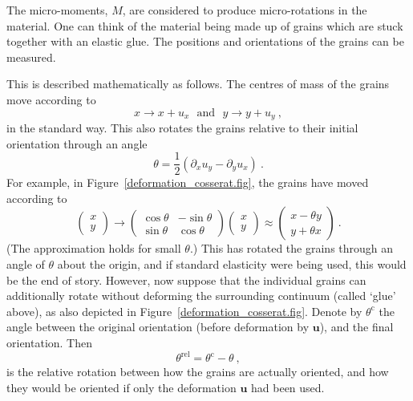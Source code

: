 \documentclass[]{scrreprt}
\newcommand{\mand}{\ \ \ \mbox{and}\ \ \ }
\newcommand{\pl}{\partial}
\newcommand{\ha}{\mbox{$\frac{1}{2}$}}
\newcommand{\thetac}{\theta^{\mathrm{c}}}
\newcommand{\thetarel}{\theta^{\mathrm{rel}}}
\begin{document}
The micro-moments, $M$, are considered to produce micro-rotations in
the material.  One can think of the material being made up of grains
which are stuck together with an elastic glue.  The positions and
orientations of the grains can be measured.

This is described mathematically as follows.  The centres of mass of
the grains move according to
$$
x \rightarrow x + u_{x} \mand y\rightarrow y+ u_{y} \ ,
$$
in the standard way.  This also rotates the grains relative to their
initial orientation through an angle
$$
\theta = \ha(\pl_{x}u_{y}-\pl_{y}u_{x}) \ .
$$
For example, in Figure~\ref{deformation_cosserat.fig}, the grains have
moved according to
\begin{equation}
\left(\begin{array}{c}x\\y\end{array}\right) \rightarrow
\left(\begin{array}{cc}\cos\theta & -\sin\theta \\ \sin\theta & \cos\theta
\end{array}\right)
\left(\begin{array}{c}x\\y\end{array}\right)
\approx
\left(\begin{array}{c}x - \theta y\\y + \theta x\end{array}\right)   \ .
\label{rigid.rot.eqn}
\end{equation}
(The approximation holds for small $\theta$.)  This has rotated the
grains through an angle of $\theta$ about the origin, and if standard
elasticity were being used, this would be the end of story.  However,
now suppose that the individual grains can additionally rotate without
deforming the surrounding continuum (called `glue' above), as also
depicted in Figure~\ref{deformation_cosserat.fig}.  Denote by
$\thetac$ the angle between the original orientation (before
deformation by ${\mathbf u}$), and the final orientation.  Then
$$
\thetarel = \thetac - \theta \ ,
$$
is the relative rotation between how the grains are actually oriented,
and how they would be oriented if only the deformation ${\mathbf u}$
had been used.
\end{document}
